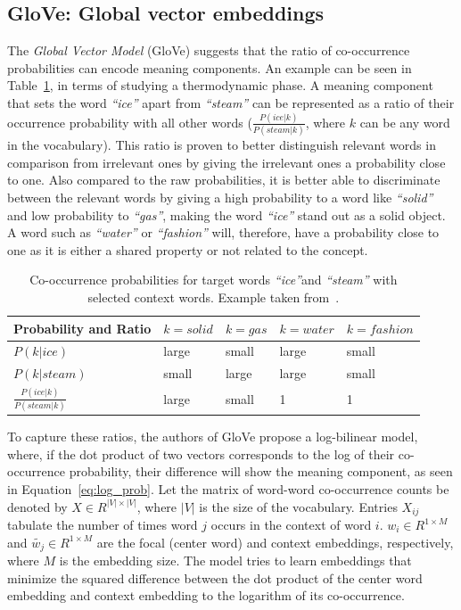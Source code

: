 \subsection{GloVe: Global vector embeddings}
\label{subsec:GloVe}
The \emph{Global Vector Model} (GloVe) suggests that the ratio of co-occurrence probabilities can encode meaning components. An example can be seen in Table~\ref{table:tab_1}, in terms of studying a thermodynamic phase. A meaning component that sets the word \emph{``ice''} apart from \emph{``steam''} can be represented as a ratio of their occurrence probability with all other words \big($\frac { P(ice|k) }{ P(steam|k) } $, where $k$ can be any word in the vocabulary\big). This ratio is proven to better distinguish relevant words in comparison from irrelevant ones by giving the irrelevant ones a probability close to one. Also compared to the raw probabilities, it is better able to discriminate between the relevant words by giving a high probability to a word like \emph{``solid''} and low probability to \emph{``gas''}, making the word \emph{``ice''} stand out as a solid object. A word such as \emph{``water''} or \emph{``fashion''} will, therefore, have a probability close to one as it is either a shared property or not related to the concept.\\
\begin{table}[]
\centering

\begin{tabular}{@{}l|l|l|l|l@{}}
\toprule
Probability and Ratio &  $k=solid$& $k=gas$ & $k=water$ &$k= fashion$  \\ \midrule $P(k|ice)$& {\color[HTML]{CB0000}large} &  {\color[HTML]{329A9D}small} & {\color[HTML]{CB0000}large} & {\color[HTML]{329A9D}small} \\\midrule
  $P(k|steam)$&{\color[HTML]{329A9D}small}  & {\color[HTML]{CB0000}large} &  {\color[HTML]{CB0000}large}&{\color[HTML]{329A9D}small}  \\\midrule
 $\frac { P(ice|k) }{ P(steam|k) } $& {\color[HTML]{CB0000}large} &  {\color[HTML]{329A9D}small}&  1 &    1  \\\midrule
\end{tabular}%
\caption{Co-occurrence probabilities for target words \emph{``ice''}and \emph{``steam''} with selected context words. Example taken from~.}
\label{table:tab_1}
\end{table}
\noindent
To capture these ratios, the authors of GloVe propose a log-bilinear model, where, if the dot product of two vectors corresponds to the log of their co-occurrence probability, their difference will show the meaning component, as seen in Equation~\ref{eq:log_prob}. Let the matrix of word-word co-occurrence counts be denoted by $X\in { R }^{ |V|\times |V| }$, where $|V|$ is the size of the vocabulary. Entries $X_{ij}$ tabulate the number of times word $j$ occurs in the context of word $i$. $w_{ i }\in { R }^{ 1\times M }$ and $\tilde{w_{ j }}\in { R }^{ 1\times M }$ are the focal (center word) and context embeddings, respectively, where $M$ is the embedding size. The model tries to learn embeddings that minimize the squared difference between the dot product of the center word embedding and context embedding to the logarithm of its co-occurrence.
